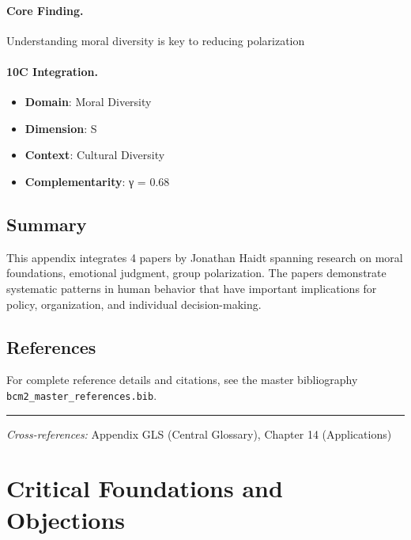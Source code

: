 \paragraph{Core Finding.}
Understanding moral diversity is key to reducing polarization

\paragraph{10C Integration.}
\begin{itemize}[nosep]
  \item \textbf{Domain}: Moral Diversity
  \item \textbf{Dimension}: S
  \item \textbf{Context}: Cultural Diversity
  \item \textbf{Complementarity}: γ = 0.68
\end{itemize}

\subsection{Summary}

This appendix integrates 4 papers by Jonathan Haidt
spanning research on moral foundations, emotional judgment, group polarization.
The papers demonstrate systematic patterns in human behavior that have important
implications for policy, organization, and individual decision-making.

\subsection{References}

For complete reference details and citations, see the master bibliography
\texttt{bcm2\_master\_references.bib}.

\vspace{1em}
\hrule
\vspace{0.5em}

\noindent\textit{Cross-references:}
Appendix GLS (Central Glossary), Chapter 14 (Applications)



\section{Critical Foundations and Objections}
\label{sec:hai-foundations}

